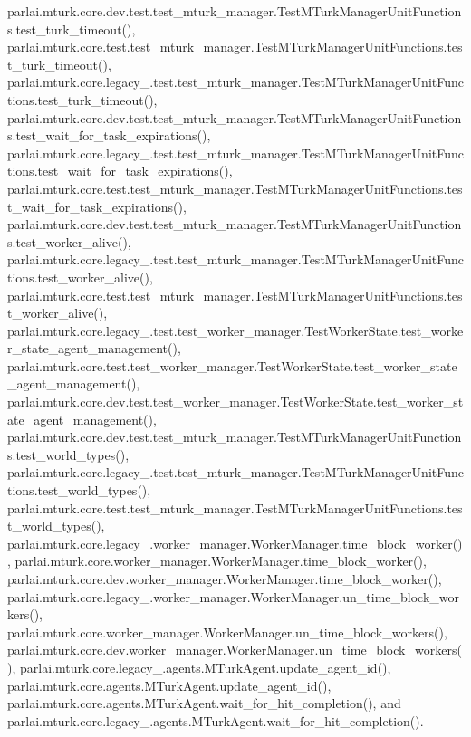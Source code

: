 parlai.\+mturk.\+core.\+dev.\+test.\+test\+\_\+mturk\+\_\+manager.\+Test\+M\+Turk\+Manager\+Unit\+Functions.\+test\+\_\+turk\+\_\+timeout(), parlai.\+mturk.\+core.\+test.\+test\+\_\+mturk\+\_\+manager.\+Test\+M\+Turk\+Manager\+Unit\+Functions.\+test\+\_\+turk\+\_\+timeout(), parlai.\+mturk.\+core.\+legacy\+\_.\+test.\+test\+\_\+mturk\+\_\+manager.\+Test\+M\+Turk\+Manager\+Unit\+Functions.\+test\+\_\+turk\+\_\+timeout(), parlai.\+mturk.\+core.\+dev.\+test.\+test\+\_\+mturk\+\_\+manager.\+Test\+M\+Turk\+Manager\+Unit\+Functions.\+test\+\_\+wait\+\_\+for\+\_\+task\+\_\+expirations(), parlai.\+mturk.\+core.\+legacy\+\_.\+test.\+test\+\_\+mturk\+\_\+manager.\+Test\+M\+Turk\+Manager\+Unit\+Functions.\+test\+\_\+wait\+\_\+for\+\_\+task\+\_\+expirations(), parlai.\+mturk.\+core.\+test.\+test\+\_\+mturk\+\_\+manager.\+Test\+M\+Turk\+Manager\+Unit\+Functions.\+test\+\_\+wait\+\_\+for\+\_\+task\+\_\+expirations(), parlai.\+mturk.\+core.\+dev.\+test.\+test\+\_\+mturk\+\_\+manager.\+Test\+M\+Turk\+Manager\+Unit\+Functions.\+test\+\_\+worker\+\_\+alive(), parlai.\+mturk.\+core.\+legacy\+\_.\+test.\+test\+\_\+mturk\+\_\+manager.\+Test\+M\+Turk\+Manager\+Unit\+Functions.\+test\+\_\+worker\+\_\+alive(), parlai.\+mturk.\+core.\+test.\+test\+\_\+mturk\+\_\+manager.\+Test\+M\+Turk\+Manager\+Unit\+Functions.\+test\+\_\+worker\+\_\+alive(), parlai.\+mturk.\+core.\+legacy\+\_.\+test.\+test\+\_\+worker\+\_\+manager.\+Test\+Worker\+State.\+test\+\_\+worker\+\_\+state\+\_\+agent\+\_\+management(), parlai.\+mturk.\+core.\+test.\+test\+\_\+worker\+\_\+manager.\+Test\+Worker\+State.\+test\+\_\+worker\+\_\+state\+\_\+agent\+\_\+management(), parlai.\+mturk.\+core.\+dev.\+test.\+test\+\_\+worker\+\_\+manager.\+Test\+Worker\+State.\+test\+\_\+worker\+\_\+state\+\_\+agent\+\_\+management(), parlai.\+mturk.\+core.\+dev.\+test.\+test\+\_\+mturk\+\_\+manager.\+Test\+M\+Turk\+Manager\+Unit\+Functions.\+test\+\_\+world\+\_\+types(), parlai.\+mturk.\+core.\+legacy\+\_.\+test.\+test\+\_\+mturk\+\_\+manager.\+Test\+M\+Turk\+Manager\+Unit\+Functions.\+test\+\_\+world\+\_\+types(), parlai.\+mturk.\+core.\+test.\+test\+\_\+mturk\+\_\+manager.\+Test\+M\+Turk\+Manager\+Unit\+Functions.\+test\+\_\+world\+\_\+types(), parlai.\+mturk.\+core.\+legacy\+\_.\+worker\+\_\+manager.\+Worker\+Manager.\+time\+\_\+block\+\_\+worker(), parlai.\+mturk.\+core.\+worker\+\_\+manager.\+Worker\+Manager.\+time\+\_\+block\+\_\+worker(), parlai.\+mturk.\+core.\+dev.\+worker\+\_\+manager.\+Worker\+Manager.\+time\+\_\+block\+\_\+worker(), parlai.\+mturk.\+core.\+legacy\+\_.\+worker\+\_\+manager.\+Worker\+Manager.\+un\+\_\+time\+\_\+block\+\_\+workers(), parlai.\+mturk.\+core.\+worker\+\_\+manager.\+Worker\+Manager.\+un\+\_\+time\+\_\+block\+\_\+workers(), parlai.\+mturk.\+core.\+dev.\+worker\+\_\+manager.\+Worker\+Manager.\+un\+\_\+time\+\_\+block\+\_\+workers(), parlai.\+mturk.\+core.\+legacy\+\_.\+agents.\+M\+Turk\+Agent.\+update\+\_\+agent\+\_\+id(), parlai.\+mturk.\+core.\+agents.\+M\+Turk\+Agent.\+update\+\_\+agent\+\_\+id(), parlai.\+mturk.\+core.\+agents.\+M\+Turk\+Agent.\+wait\+\_\+for\+\_\+hit\+\_\+completion(), and parlai.\+mturk.\+core.\+legacy\+\_.\+agents.\+M\+Turk\+Agent.\+wait\+\_\+for\+\_\+hit\+\_\+completion().


